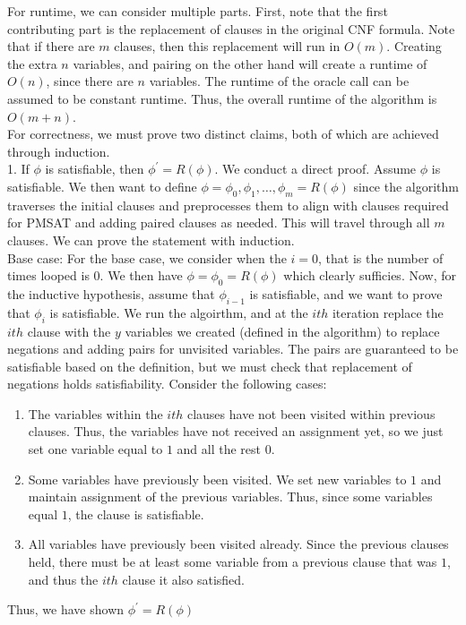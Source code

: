 \documentclass[11pt]{article}
\begin{document}
\begin{enumerate}
\begin{enumerate}
        For runtime, we can consider multiple parts. First, note that the first contributing part is the replacement of clauses in the original CNF formula. Note that if there are $m$ clauses, then this replacement will run in $O(m)$. Creating the extra $n$ variables, and pairing on the other hand will create a runtime of $O(n)$, since there are $n$ variables. The runtime of the oracle call can be assumed to be constant runtime. Thus, the overall runtime of the algorithm is $O(m + n)$. \\
        
        For correctness, we must prove two distinct claims, both of which are achieved through induction. \\
        
        1. If $\phi$ is satisfiable, then $\phi^' =  R(\phi)$. We conduct a direct proof. Assume $\phi$ is satisfiable. We then want to define $\phi = \phi_0, \phi_1, \dots, \phi_m = R(\phi)$ since the algorithm traverses the initial clauses and preprocesses them to align with clauses required for PMSAT and adding paired clauses as needed. This will travel through all $m$ clauses. We can prove the statement with induction. \\
        
        Base case: For the base case, we consider when the $i=0$, that is the number of times looped is $0$. We then have $\phi = \phi_0 = R(\phi)$ which clearly sufficies. Now, for the inductive hypothesis, assume that $\phi_{i-1}$ is satisfiable, and we want to prove that $\phi_i$ is satisfiable. We run the algoirthm, and at the $ith$ iteration replace the $ith$ clause with the $y$ variables we created (defined in the algorithm) to replace negations and adding pairs for unvisited variables. The pairs are guaranteed to be satisfiable based on the definition, but we must check that replacement of negations holds satisfiability. Consider the following cases: 
        \begin{enumerate}
            \item  The variables within the $ith$ clauses have not been visited within previous clauses. Thus, the variables have not received an assignment yet, so we just set one variable equal to $1$ and all the rest 0. 
            \item Some variables have previously been visited. We set new variables to $1$ and maintain assignment of the previous variables. Thus, since some variables equal $1$, the clause is satisfiable. 
            \item All variables have previously been visited already. Since the previous clauses held, there must be at least some variable from a previous clause that was $1$, and thus the $ith$ clause it also satisfied.
        \end{enumerate}
        Thus, we have shown $\phi^{'} = R(\phi)$ \\
        

\end{enumerate}
\end{enumerate}
\end{document}
